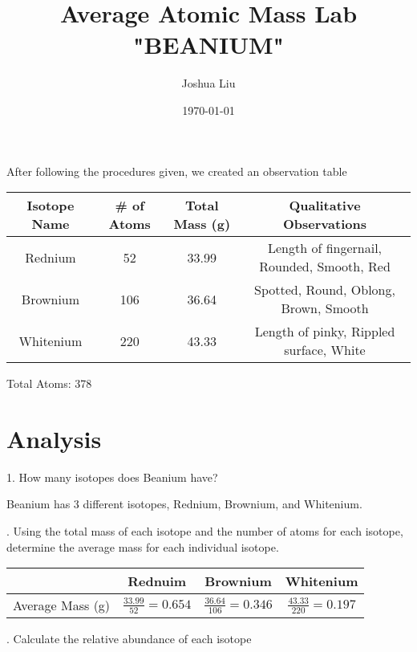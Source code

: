 \documentclass[10pt]{extarticle}
\title{Average Atomic Mass Lab "BEANIUM"}
\author{Joshua Liu}
\date{\today}
\begin{document}
    \maketitle
    After following the procedures given, we created an observation table
    
    \begin{center}
        \begin{tabular}{c|c|c|c}
            Isotope Name&\# of Atoms&Total Mass (g)&Qualitative Observations\\
            \hline
            Rednium&52&33.99&Length of fingernail, Rounded, Smooth, Red\\
            Brownium&106&36.64&Spotted, Round, Oblong, Brown, Smooth\\
            Whitenium&220&43.33&Length of pinky, Rippled surface, White\\
        \end{tabular}
    \end{center}

    Total Atoms: 378
    \section*{Analysis}

    1. How many isotopes does Beanium have?

    Beanium has 3 different isotopes, Rednium, Brownium, and Whitenium.

    \medskip
    . Using the total mass of each isotope and the number of atoms for each isotope, determine the average mass for each individual isotope.

    \medskip
    \begin{tabular}{c|c|c|c}
        &Rednuim&Brownium&Whitenium\\
        \hline
        \newline
        \vspace*{2 cm}
        \newline
        Average Mass (g)&$\frac{33.99}{52}=0.654$&$\frac{36.64}{106}=0.346$&$\frac{43.33}{220}=0.197$\\
    \end{tabular}
    
    . Calculate the relative abundance of each isotope
\end{document}
